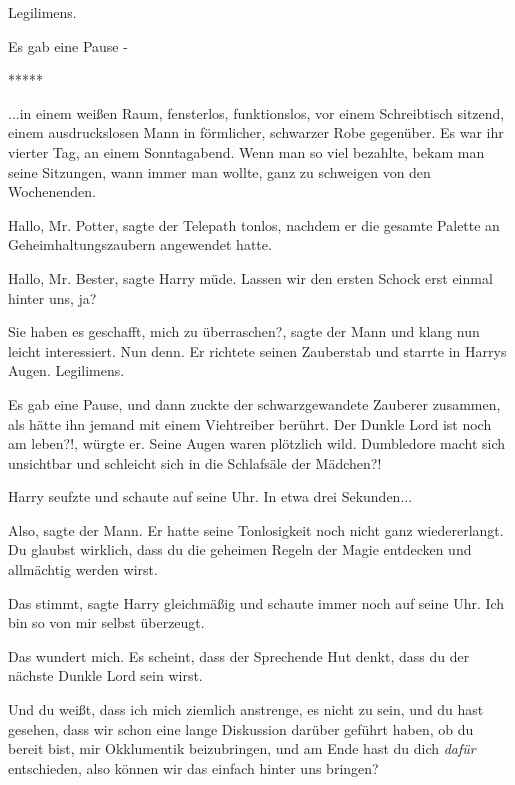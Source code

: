 \glqq{}Legilimens.\grqq{}

Es gab eine Pause -

\begin{center}*****\end{center}

...in einem weißen Raum, fensterlos, funktionslos, vor einem Schreibtisch
sitzend, einem ausdruckslosen Mann in förmlicher, schwarzer Robe gegenüber. Es
war ihr vierter Tag, an einem Sonntagabend. Wenn man so viel bezahlte, bekam man
seine Sitzungen, wann immer man wollte, ganz zu schweigen von den Wochenenden.

\glqq{}Hallo, Mr. Potter\grqq{}, sagte der Telepath tonlos, nachdem er die
gesamte Palette an Geheimhaltungszaubern angewendet hatte.

\glqq{}Hallo, Mr. Bester\grqq{}, sagte Harry müde. \glqq{}Lassen wir den ersten
Schock erst einmal hinter uns, ja?\grqq{}

\glqq{}Sie haben es geschafft, mich zu überraschen?\grqq{}, sagte der Mann und
klang nun leicht interessiert. \glqq{}Nun denn.\grqq{} Er richtete seinen
Zauberstab und starrte in Harrys Augen. \glqq{} Legilimens.\grqq{}

Es gab eine Pause, und dann zuckte der schwarzgewandete Zauberer zusammen, als
hätte ihn jemand mit einem Viehtreiber berührt. \glqq{}Der Dunkle Lord ist noch
am leben?!\grqq{}, würgte er. Seine Augen waren plötzlich wild.
\glqq{}Dumbledore macht sich unsichtbar und schleicht sich in die Schlafsäle der
Mädchen?!\grqq{}

Harry seufzte und schaute auf seine Uhr. In etwa drei Sekunden...

\glqq{}Also\grqq{}, sagte der Mann. Er hatte seine Tonlosigkeit noch nicht ganz
wiedererlangt. \glqq{}Du glaubst wirklich, dass du die geheimen Regeln der Magie
entdecken und allmächtig werden wirst.\grqq{}

\glqq{}Das stimmt\grqq{}, sagte Harry gleichmäßig und schaute immer noch auf
seine Uhr. \glqq{}Ich bin so von mir selbst überzeugt.\grqq{}

\glqq{}Das wundert mich. Es scheint, dass der Sprechende Hut denkt, dass du der
nächste Dunkle Lord sein wirst.\grqq{}

\glqq{}Und du weißt, dass ich mich ziemlich anstrenge, es nicht zu sein, und du
hast gesehen, dass wir schon eine lange Diskussion darüber geführt haben, ob du
bereit bist, mir Okklumentik beizubringen, und am Ende hast du dich \emph{dafür}
entschieden, also können wir das einfach hinter uns bringen?\grqq{}

